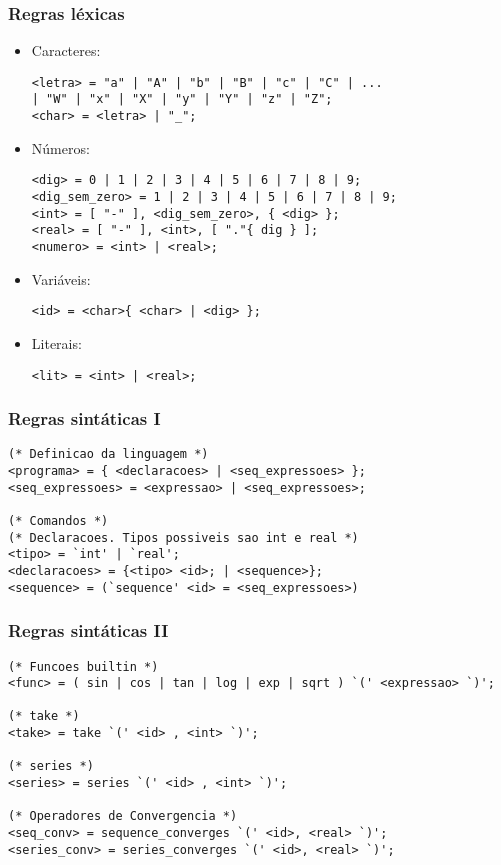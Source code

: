 \documentclass{beamer}
\begin{document}
\begin{frame}[fragile]
  \frametitle{Regras l\'exicas}

\begin{itemize}
\item Caracteres:
\begin{verbatim}
<letra> = "a" | "A" | "b" | "B" | "c" | "C" | ...
| "W" | "x" | "X" | "y" | "Y" | "z" | "Z";
<char> = <letra> | "_";
\end{verbatim}
\item N\'umeros:
\begin{verbatim}
<dig> = 0 | 1 | 2 | 3 | 4 | 5 | 6 | 7 | 8 | 9;
<dig_sem_zero> = 1 | 2 | 3 | 4 | 5 | 6 | 7 | 8 | 9;
<int> = [ "-" ], <dig_sem_zero>, { <dig> };
<real> = [ "-" ], <int>, [ "."{ dig } ];
<numero> = <int> | <real>;
\end{verbatim}

\item Vari\'aveis:
\begin{verbatim}
<id> = <char>{ <char> | <dig> };
\end{verbatim}

\item Literais:
\begin{verbatim}
<lit> = <int> | <real>;
\end{verbatim}
\end{itemize}
\end{frame}



\begin{frame}[fragile]
\frametitle{Regras sint\'aticas I}
\begin{verbatim}
(* Definicao da linguagem *)
<programa> = { <declaracoes> | <seq_expressoes> };
<seq_expressoes> = <expressao> | <seq_expressoes>;

(* Comandos *)
(* Declaracoes. Tipos possiveis sao int e real *)
<tipo> = `int' | `real';
<declaracoes> = {<tipo> <id>; | <sequence>};
<sequence> = (`sequence' <id> = <seq_expressoes>)
\end{verbatim}
\end{frame}

\begin{frame}[fragile]
\frametitle{Regras sint\'aticas II}
\begin{verbatim}
(* Funcoes builtin *)
<func> = ( sin | cos | tan | log | exp | sqrt ) `(' <expressao> `)';

(* take *)
<take> = take `(' <id> , <int> `)';

(* series *)
<series> = series `(' <id> , <int> `)';

(* Operadores de Convergencia *)
<seq_conv> = sequence_converges `(' <id>, <real> `)';
<series_conv> = series_converges `(' <id>, <real> `)';
\end{verbatim}
\end{frame}
\end{document}
